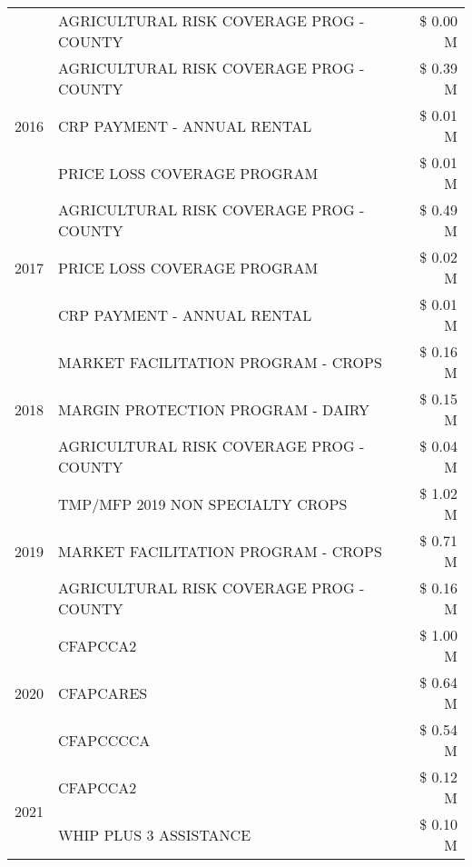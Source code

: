 \begin{tabular}{llr}
 & AGRICULTURAL RISK COVERAGE PROG - COUNTY & \$ 0.00 M \\
\cline{1-3}
\multirow[t]{3}{*}{2016} & AGRICULTURAL RISK COVERAGE PROG - COUNTY & \$ 0.39 M \\
 & CRP PAYMENT - ANNUAL RENTAL & \$ 0.01 M \\
 & PRICE LOSS COVERAGE PROGRAM & \$ 0.01 M \\
\cline{1-3}
\multirow[t]{3}{*}{2017} & AGRICULTURAL RISK COVERAGE PROG - COUNTY & \$ 0.49 M \\
 & PRICE LOSS COVERAGE PROGRAM & \$ 0.02 M \\
 & CRP PAYMENT - ANNUAL RENTAL & \$ 0.01 M \\
\cline{1-3}
\multirow[t]{3}{*}{2018} & MARKET FACILITATION PROGRAM - CROPS & \$ 0.16 M \\
 & MARGIN PROTECTION PROGRAM - DAIRY & \$ 0.15 M \\
 & AGRICULTURAL RISK COVERAGE PROG - COUNTY & \$ 0.04 M \\
\cline{1-3}
\multirow[t]{3}{*}{2019} & TMP/MFP 2019 NON SPECIALTY CROPS & \$ 1.02 M \\
 & MARKET FACILITATION PROGRAM - CROPS & \$ 0.71 M \\
 & AGRICULTURAL RISK COVERAGE PROG - COUNTY & \$ 0.16 M \\
\cline{1-3}
\multirow[t]{3}{*}{2020} & CFAPCCA2 & \$ 1.00 M \\
 & CFAPCARES & \$ 0.64 M \\
 & CFAPCCCCA & \$ 0.54 M \\
\cline{1-3}
\multirow[t]{2}{*}{2021} & CFAPCCA2 & \$ 0.12 M \\
 & WHIP PLUS 3 ASSISTANCE & \$ 0.10 M \\
\cline{1-3}
\bottomrule
\end{tabular}
